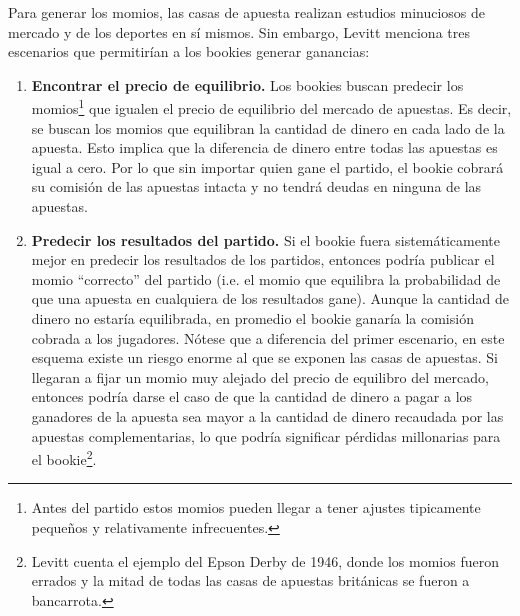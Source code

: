 Para generar los momios, las casas de apuesta realizan estudios minuciosos de mercado y de los deportes en sí mismos. Sin embargo, Levitt \cite{levitt2004gambling} menciona tres escenarios que permitirían a los bookies generar ganancias:
\begin{enumerate}
	\item \textbf{Encontrar el precio de equilibrio.} Los bookies buscan predecir los momios\footnote{Antes del partido estos momios pueden llegar a tener ajustes tipicamente pequeños y relativamente infrecuentes.} que igualen el precio de equilibrio del mercado de apuestas. Es decir, se buscan los momios que equilibran la cantidad de dinero en cada lado de la apuesta. Esto implica que la diferencia de dinero entre todas las apuestas es igual a cero. Por lo que sin importar quien gane el partido, el bookie cobrará su comisión de las apuestas intacta y no tendrá deudas en ninguna de las apuestas.
	
	\item \textbf{Predecir los resultados del partido.} Si el bookie fuera sistemáticamente mejor en predecir los resultados de los partidos, entonces podría publicar el momio ``correcto'' del partido (i.e. el momio que equilibra la probabilidad de que una apuesta en cualquiera de los resultados gane). Aunque la cantidad de dinero no estaría equilibrada, en promedio el bookie ganaría la comisión cobrada a los jugadores. Nótese que a diferencia del primer escenario, en este esquema existe un riesgo enorme al que se exponen las casas de apuestas. Si llegaran a fijar un momio muy alejado del precio de equilibro del mercado, entonces podría darse el caso de que la cantidad de dinero a pagar a los ganadores de la apuesta sea mayor a la cantidad de dinero recaudada por las apuestas complementarias, lo que podría significar pérdidas millonarias para el bookie\footnote{Levitt \cite{levitt2004gambling} cuenta el ejemplo del Epson Derby de 1946, donde los momios fueron errados y la mitad de todas las casas de apuestas británicas se fueron a bancarrota.}.
	

\end{enumerate}
